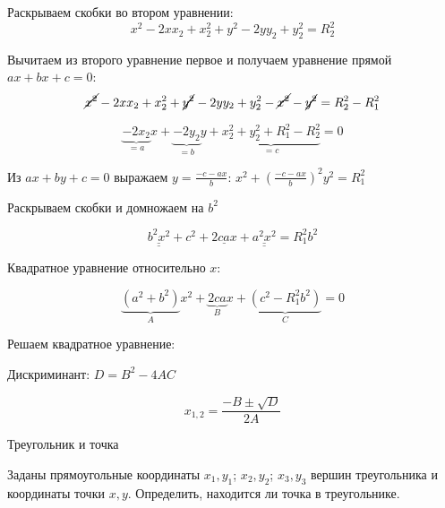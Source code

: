 \documentclass[a4paper,notitlepage,11pt]{article}
\begin{document}

Раскрываем скобки во втором уравнении:
$$x^2 - 2x{x_2} + x_2^2 + y^2 - 2y{y_2} + y_2^2 = {R_2^2}$$

Вычитаем из второго уравнение первое и получаем уравнение прямой $ax + bx + c = 0$:
$$\cancel{x^2} - 2x{x_2} + x_2^2 + \cancel{y^2} - 2y{y_2} + y_2^2 - \cancel{x^2} - \cancel{y^2} = {R_2^2} - {R_1^2}$$

$$\underbrace{-2{x_2}}_{= a}x + \underbrace{- 2{y_2}}_{= b}y + \underbrace{x_2^2 + y_2^2 + {R_1^2} - {R_2^2}}_{= c} = 0$$

Из $ax + by + c = 0$ выражаем $y = \frac{-c-ax}{b}$: 
$x^2 + (\frac{-c-ax}{b})^2 y^2 = R_1^2$

Раскрываем скобки и домножаем на $b^2$

$$\underline{\underline{{b^2}{x^2}}} + c^2 + \underline{2cax} + \underline{\underline{{a^2}{x^2}}} = {R_1^2}{b^2}$$

Квадратное уравнение относительно $x$:

$$\underbrace{(a^2+b^2)}_{A}x^2 + \underbrace{2ca}_{B}x + \underbrace{(c^2 - {R_1^2}{b^2})}_{C} = 0$$

Решаем квадратное уравнение:

Дискриминант: $D = B^2 - 4AC$


$$x_{1,2} = \frac{-B \pm \sqrt{D}}{2A}$$




\centerline{\Huge Треугольник и точка}

Заданы прямоугольные координаты $x_1, y_1$; $x_2, y_2$; $x_3, y_3$ вершин треугольника 
и координаты точки $x, y$. 
Определить, находится ли точка в треугольнике.
\end{document}
